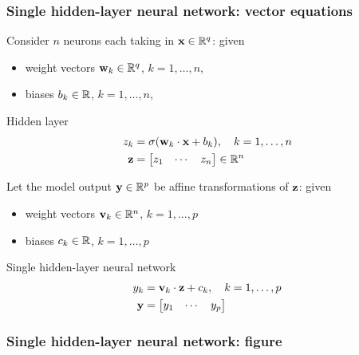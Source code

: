 \begin{frame}
    \frametitle{Single hidden-layer neural network: vector equations}

    Consider $n$ neurons each taking in $\mathbf{x} \in \mathbb{R}^q$: given
    \begin{itemize}
        \item weight vectors $\mathbf{w}_k \in \mathbb{R}^q$, $k = 1, \ldots, n$,
        \item biases $b_k \in \mathbb{R}$, $k = 1, \ldots, n$,
    \end{itemize}
    \begin{block}{\alert{Hidden layer}}
        \vspace{-1em}
        \begin{align*}
            z_k &= \sigma(\mathbf{w}_k \cdot \mathbf{x} + b_k), \quad k = 1, \ldots, n \\
            \mathbf{z} &= \begin{bmatrix} z_1 & \cdots & z_n \end{bmatrix} \in \mathbb{R}^n
        \end{align*}
    \end{block}
    \pause

    Let the model output $\mathbf{y} \in \mathbb{R}^p$ be affine transformations of $\mathbf{z}$: given
    \begin{itemize}
        \item weight vectors $\mathbf{v}_k \in \mathbb{R}^n$, $k = 1, \ldots, p$
        \item biases $c_k \in \mathbb{R}$, $k = 1, \ldots, p$
    \end{itemize}
    \begin{block}{Single hidden-layer neural network}
        \vspace{-1em}
        \begin{align*}
            y_k &= \mathbf{v}_k \cdot \mathbf{z} + c_k, \quad k = 1, \ldots, p \\
            \mathbf{y} &= \begin{bmatrix} y_1 & \cdots & y_p \end{bmatrix}
        \end{align*}
    \end{block}
\end{frame}

\begin{frame}
    \frametitle{Single hidden-layer neural network: figure}

    \centering
    
\end{frame}

